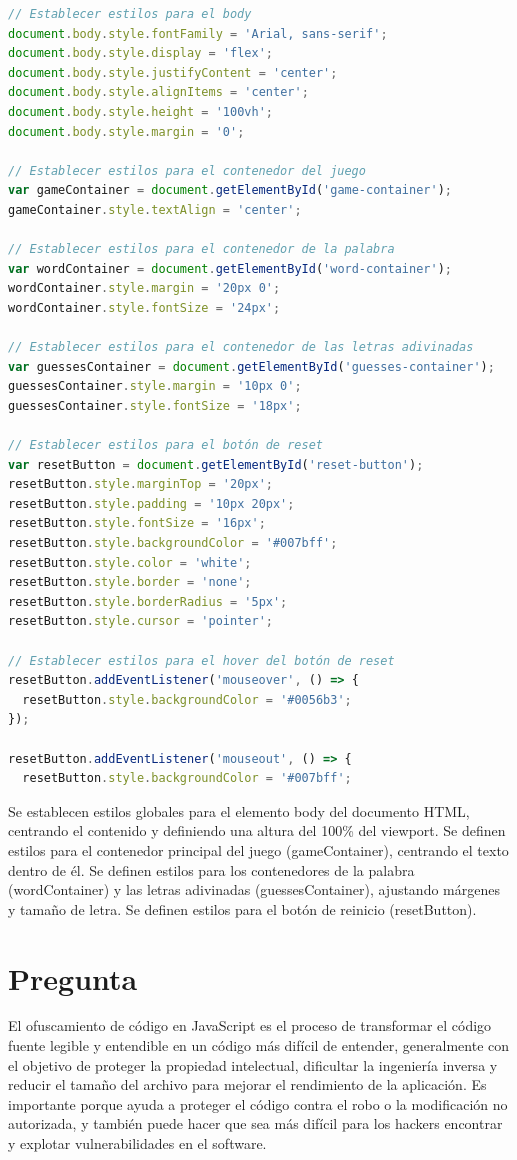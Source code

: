 \begin{lstlisting}[language=JavaScript]
// Establecer estilos para el body
document.body.style.fontFamily = 'Arial, sans-serif';
document.body.style.display = 'flex';
document.body.style.justifyContent = 'center';
document.body.style.alignItems = 'center';
document.body.style.height = '100vh';
document.body.style.margin = '0';

// Establecer estilos para el contenedor del juego
var gameContainer = document.getElementById('game-container');
gameContainer.style.textAlign = 'center';

// Establecer estilos para el contenedor de la palabra
var wordContainer = document.getElementById('word-container');
wordContainer.style.margin = '20px 0';
wordContainer.style.fontSize = '24px';

// Establecer estilos para el contenedor de las letras adivinadas
var guessesContainer = document.getElementById('guesses-container');
guessesContainer.style.margin = '10px 0';
guessesContainer.style.fontSize = '18px';

// Establecer estilos para el botón de reset
var resetButton = document.getElementById('reset-button');
resetButton.style.marginTop = '20px';
resetButton.style.padding = '10px 20px';
resetButton.style.fontSize = '16px';
resetButton.style.backgroundColor = '#007bff';
resetButton.style.color = 'white';
resetButton.style.border = 'none';
resetButton.style.borderRadius = '5px';
resetButton.style.cursor = 'pointer';

// Establecer estilos para el hover del botón de reset
resetButton.addEventListener('mouseover', () => {
  resetButton.style.backgroundColor = '#0056b3';
});

resetButton.addEventListener('mouseout', () => {
  resetButton.style.backgroundColor = '#007bff';
\end{lstlisting}
Se establecen estilos globales para el elemento body del documento HTML, centrando el contenido y definiendo una altura del 100\% del viewport. Se definen estilos para el contenedor principal del juego (gameContainer), centrando el texto dentro de él. Se definen estilos para los contenedores de la palabra (wordContainer) y las letras adivinadas (guessesContainer), ajustando márgenes y tamaño de letra. Se definen estilos para el botón de reinicio (resetButton).

\section{Pregunta}
El ofuscamiento de código en JavaScript es el proceso de transformar el código fuente legible y entendible en un código más difícil de entender, generalmente con el objetivo de proteger la propiedad intelectual, dificultar la ingeniería inversa y reducir el tamaño del archivo para mejorar el rendimiento de la aplicación. Es importante porque ayuda a proteger el código contra el robo o la modificación no autorizada, y también puede hacer que sea más difícil para los hackers encontrar y explotar vulnerabilidades en el software.
